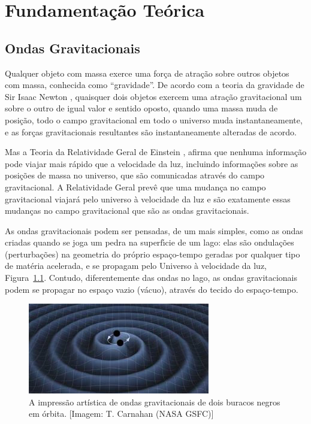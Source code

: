 \chapter{Fundamentação Teórica}
\section{Ondas Gravitacionais}

Qualquer objeto com massa exerce uma força de atração sobre outros objetos com massa, conhecida como “gravidade”. De acordo com a teoria da gravidade de Sir Isaac Newton \cite{newton1687philosophiae}, quaisquer dois objetos exercem uma atração gravitacional um sobre o outro de igual valor e sentido oposto, quando uma massa muda de posição, todo o campo gravitacional em todo o universo muda instantaneamente, e as forças gravitacionais resultantes são instantaneamente alteradas de acordo.

Mas a Teoria da Relatividade Geral de Einstein \cite{albert1920realtivity}, afirma que nenhuma informação pode viajar mais rápido que a velocidade da luz, incluindo informações sobre as posições de massa no universo, que são comunicadas através do campo gravitacional. A Relatividade Geral prevê que uma mudança no campo gravitacional viajará pelo universo à velocidade da luz e são exatamente essas mudanças no campo gravitacional que são as ondas gravitacionais.

As ondas gravitacionais podem ser pensadas, de um mais simples, como as ondas criadas quando se joga um pedra na superfı́cie de um lago: elas são ondulações (perturbações) na geometria do próprio espaço-tempo geradas por qualquer tipo de matéria acelerada, e se propagam pelo Universo à velocidade da luz, Figura~\ref{figespaçotempo}. Contudo, diferentemente das ondas no lago, as ondas gravitacionais podem se propagar no espaço vazio (vácuo), através do tecido do espaço-tempo.

\begin{figure}[ht]
\centering
\includegraphics[width=.9\textwidth]{figuras/binary-wave_tn.jpg}
\caption{A impressão artística de ondas gravitacionais de dois buracos negros em órbita. [Imagem: T. Carnahan (NASA GSFC)]}
\label{figespaçotempo}
\end{figure}

